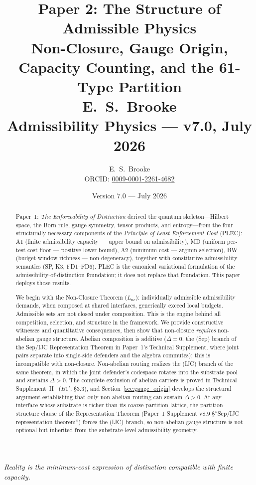 \documentclass[11pt]{article}
\title{
  \textbf{Paper 2: The Structure of Admissible Physics}\\
  \large Non-Closure, Gauge Origin, Capacity Counting, and the 61-Type Partition\\
  \normalsize E.\ S.\ Brooke\\
  Admissibility Physics --- v7.0, July 2026
}
\author{E.\ S.\ Brooke \\[0.4em] \normalsize ORCID: \href{https://orcid.org/0009-0001-2261-4682}{0009-0001-2261-4682}}
\date{Version 7.0 --- July 2026}
\begin{document}
\maketitle

\bigskip

\begin{center}
\textit{Reality is the minimum-cost expression of distinction compatible with finite capacity.}
\end{center}

\bigskip

\begin{abstract}
\noindent
Paper~1: \emph{The Enforceability of Distinction} derived the quantum skeleton---Hilbert space, the Born rule, gauge symmetry, tensor products, and entropy---from the four structurally necessary components of the \emph{Principle of Least Enforcement Cost} (PLEC): A1 (finite admissibility capacity --- upper bound on admissibility), MD (uniform per-test cost floor --- positive lower bound), A2 (minimum cost --- argmin selection), BW (budget-window richness --- non-degeneracy), together with constitutive admissibility semantics (SP, K3, FD1--FD6).  PLEC is the canonical variational formulation of the admissibility-of-distinction foundation; it does not replace that foundation.  This paper deploys those results.

We begin with the Non-Closure Theorem ($L_{\mathrm{nc}}$): individually admissible admissibility demands, when composed at shared interfaces, generically exceed local budgets.  Admissible sets are not closed under composition.  This is the engine behind all competition, selection, and structure in the framework.  We provide constructive witnesses and quantitative consequences, then show that non-closure \emph{requires} non-abelian gauge structure. Abelian composition is additive ($\Delta = 0$, the (Sep) branch of the Sep/IJC Representation Theorem in Paper~1's Technical Supplement, where joint pairs separate into single-side defenders and the algebra commutes); this is incompatible with non-closure. Non-abelian routing realizes the (IJC) branch of the same theorem, in which the joint defender's codespace rotates into the substrate pool and sustains $\Delta > 0$. The complete exclusion of abelian carriers is proved in Technical Supplement~II~\cite{BrookeP2FoundSupplement} ($B1'$, \S3.3), and Section~\ref{sec:gauge_origin} develops the structural argument establishing that only non-abelian routing can sustain $\Delta > 0$.  At any interface whose substrate is richer than its coarse partition lattice, the partition-structure clause of the Representation Theorem (Paper~1 Supplement v8.9 \S``Sep/IJC representation theorem'') forces the (IJC) branch, so non-abelian gauge structure is not optional but inherited from the substrate-level admissibility geometry.


\end{abstract}
\end{document}
